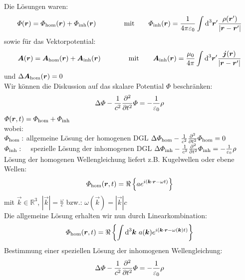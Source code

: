 Die Lösungen waren:
\begin{equation*}
\varPhi(\bm{r}) = \varPhi_{\textrm{hom}}(\bm{r}) + \varPhi_{\textrm{inh}}(\bm{r})
\qquad \qquad
\textrm{mit}
\qquad 
\varPhi_{\textrm{inh}}(\bm{r}) = \frac{1}{4\pi\varepsilon_0} \int \textrm{d}^3 \bm{r}' \frac{\rho(\bm{r}')}{| \bm{r} - \bm{r}' |}
\end{equation*}
sowie für das Vektorpotential:
\begin{equation*}
\bm{A}(\bm{r}) = \bm{A}_{\textrm{hom}} (\bm{r}) + \bm{A}_{\textrm{inh}} (\bm{r})
\qquad \qquad 
\textrm{mit}
\qquad
\bm{A}_{\textrm{inh}} (\bm{r}) = \frac{\mu_0}{4 \pi} \int \textrm{d} ^3 \bm{r}' \frac{\bm{j}(\bm{r})}{| \bm{r} - \bm{r}' |}
\end{equation*}
und $ \Delta \bm{A}_{\textrm{hom}}(\bm{r}) = 0 $\\[10pt]
Wir können die Diskussion auf das skalare Potential $ \Phi $ beschränken:
\begin{equation*}
\Delta \varPhi - \frac{1}{c^2} \frac{\partial ^2}{\partial t^2} \varPhi = - \frac{1}{\varepsilon_0} \rho
\end{equation*}
$ \varPhi(\bm{r},t) = \varPhi_{\textrm{hom}} + \varPhi_{\textrm{inh}} $\\
wobei:\\
$ \varPhi_{\textrm{hom}} : $ allgemeine Lösung der homogenen DGL $ \Delta \varPhi_{\textrm{hom}} - \frac{1}{c^2} \frac{\partial ^2}{\partial t^2} \varPhi_{\textrm{hom}} = 0 $ \\
$ \varPhi_{\textrm{inh}} : $ \ \, spezielle Lösung der inhomogenen DGL $ \Delta \varPhi_{\textrm{inh}} - \frac{1}{c^2} \frac{\partial ^2}{\partial t^2} \varPhi_{\textrm{inh}} = - \frac{1}{\varepsilon_0} \rho $\\[5pt]
Lösung der homogenen Wellengleichung liefert z.B. Kugelwellen oder ebene Wellen:
\begin{equation*}
\varPhi_{\textrm{hom}}(\bm{r},t) = \Re \left\{ a e^{i(\bm{k} \cdot \bm{r} - \omega t)} \right\}
\end{equation*}
mit $ \vec{k} \in \mathbb{R}^3 $, $ |\vec{k}| = \frac{\omega}{c} $ bzw.: $ \omega(\vec{k}) = |\vec{k}| c $\\[5pt]
Die allgemeine Lösung erhalten wir nun durch Linearkombination:
\begin{equation*}
\varPhi_{\textrm{hom}}(\bm{r},t) = \Re \left\{ \int \textrm{d} ^3 \bm{k} \ a (\bm{k}) e^{i (\bm{k} \cdot \bm{r} - \omega(\bm{k}) t)} \right\}
\end{equation*}
Bestimmung einer speziellen Lösung der inhomogenen Wellengleichung:
\begin{equation*}
\Delta \varPhi - \frac{1}{c^2} \frac{\partial ^2}{\partial t^2} \varPhi = - \frac{1}{\varepsilon_0} \rho
\end{equation*}
